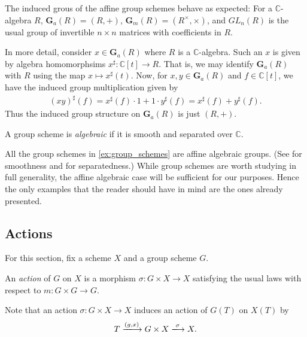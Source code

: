 \documentclass[12pt]{ociamthesis}  %
\begin{document}
\begin{example}
  The induced grous of the affine group schemes behave as expected:
  For a $\mathbb{C}$-algebra $R$, $\mathbf{G}_a(R) = (R,+)$,
  $\mathbf{G}_m(R) = (R^\times,\times)$, and
  $GL_n(R)$ is the usual group of invertible $n\times n$ matrices
  with coefficients in $R$.

  In more detail, consider $x\in\mathbf{G}_a(R)$ where $R$ is
  a $\mathbb{C}$-algebra. Such an $x$ is given by algebra homomorphsims
  $x^\sharp:\mathbb{C}[t] \to R$. That is, we may identify
  $\mathbf{G}_a(R)$ with $R$ using the map $x \mapsto x^\sharp(t)$. Now,
  for $x,y\in\mathbf{G}_a(R)$ and $f\in \mathbb{C}[t]$, we have the
  induced group multiplication given by
  \begin{align*}
    (xy)^\sharp(f)
    = x^\sharp(f) \cdot 1 + 1 \cdot y^\sharp(f)
    = x^\sharp(f) + y^\sharp(f).
  \end{align*}
  Thus the induced group structure on $\mathbf{G}_a(R)$ is just $(R,+)$.
\end{example}

\begin{definition}
  A group scheme is \emph{algebraic} if it is smooth and separated
  over $\mathbb{C}$.
\end{definition}

\begin{example}
  All the group schemes in \ref{ex:group_schemes} are affine algebraic
  groups. (See \cite[IV Theorem 9,3]{milne2012} for smoothness
  and \cite[Remark 3.2]{hoskins2016} for separatedness.) While group
  schemes are worth studying in full generality, the affine algebraic
  case will be sufficient for our purposes. Hence the only examples
  that the reader should have in mind are the ones already presented.
\end{example}

\subsection{Actions}

For this section, fix a scheme $X$ and a group scheme $G$.

\begin{definition}
  An \emph{action} of $G$ on $X$ is a morphism
  $\sigma : G\times X\to X$ satisfying the usual laws with respect
  to $m:G\times G\to G$.
\end{definition}

Note that an action $\sigma : G\times X\to X$ induces an action of
$G(T)$ on $X(T)$ by
\begin{equation*}
  T \xlongrightarrow{(g,x)} G\times X \xlongrightarrow{\sigma} X.
\end{equation*}
\end{document}
